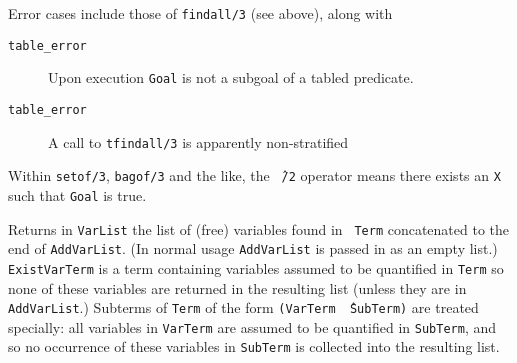 \begin{description}
% 
% 
% 
% 
% 
% 
% 
% 
% 

Error cases include those of {\tt findall/3} (see above), along with 
    \begin{description}
    \item[{\tt table\_error}]
	Upon execution {\tt Goal} is not a subgoal of a tabled predicate.
    \item[{\tt table\_error}]
	A call to {\tt tfindall/3} is apparently non-stratified
    \end{description}




%
Within {\tt setof/3}, {\tt bagof/3} and the like, the {\tt \^\ /2}
operator means there exists an {\tt X} such that {\tt Goal} is true.

Returns in {\tt VarList} the list of (free) variables found in {\tt
Term} concatenated to the end of {\tt AddVarList}.  (In normal usage
{\tt AddVarList} is passed in as an empty list.)  {\tt ExistVarTerm}
is a term containing variables assumed to be quantified in {\tt Term}
so none of these variables are returned in the resulting list (unless
they are in {\tt AddVarList}.)  Subterms of {\tt Term} of the form
{\tt (VarTerm \^\ SubTerm)} are treated specially: all variables in {\tt VarTerm} are
assumed to be quantified in {\tt SubTerm}, and so no occurrence of these
variables in {\tt SubTerm} is collected into the resulting list.


\end{description}

